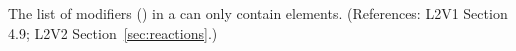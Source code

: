 The list of modifiers () in a \Reaction can only
contain  elements.  (References: L2V1
Section 4.9; L2V2 Section~\ref{sec:reactions}.)
